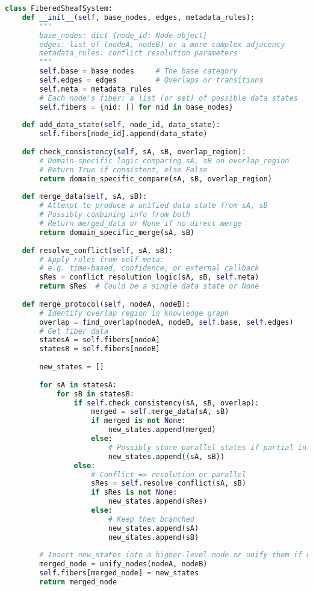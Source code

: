 \documentclass{article}
\begin{document}
\begin{lstlisting}[language=Python, caption=Fibered-Sheaf Merge Protocol in Pythonic Pseudocode, label=lst:python_impl]
class FiberedSheafSystem:
    def __init__(self, base_nodes, edges, metadata_rules):
        """
        base_nodes: dict {node_id: Node object}
        edges: list of (nodeA, nodeB) or a more complex adjacency
        metadata_rules: conflict resolution parameters
        """
        self.base = base_nodes     # The base category
        self.edges = edges         # Overlaps or transitions
        self.meta = metadata_rules
        # Each node's fiber: a list (or set) of possible data states
        self.fibers = {nid: [] for nid in base_nodes}
    
    def add_data_state(self, node_id, data_state):
        self.fibers[node_id].append(data_state)
    
    def check_consistency(self, sA, sB, overlap_region):
        # Domain-specific logic comparing sA, sB on overlap_region
        # Return True if consistent, else False
        return domain_specific_compare(sA, sB, overlap_region)
    
    def merge_data(self, sA, sB):
        # Attempt to produce a unified data state from sA, sB
        # Possibly combining info from both
        # Return merged_data or None if no direct merge
        return domain_specific_merge(sA, sB)
    
    def resolve_conflict(self, sA, sB):
        # Apply rules from self.meta:
        # e.g. time-based, confidence, or external callback
        sRes = conflict_resolution_logic(sA, sB, self.meta)
        return sRes  # Could be a single data state or None
    
    def merge_protocol(self, nodeA, nodeB):
        # Identify overlap region in knowledge graph
        overlap = find_overlap(nodeA, nodeB, self.base, self.edges)
        # Get fiber data
        statesA = self.fibers[nodeA]
        statesB = self.fibers[nodeB]
        
        new_states = []
        
        for sA in statesA:
            for sB in statesB:
                if self.check_consistency(sA, sB, overlap):
                    merged = self.merge_data(sA, sB)
                    if merged is not None:
                        new_states.append(merged)
                    else:
                        # Possibly store parallel states if partial info
                        new_states.append((sA, sB))  
                else:
                    # Conflict => resolution or parallel
                    sRes = self.resolve_conflict(sA, sB)
                    if sRes is not None:
                        new_states.append(sRes)
                    else:
                        # Keep them branched
                        new_states.append(sA)
                        new_states.append(sB)
        
        # Insert new_states into a higher-level node or unify them if needed
        merged_node = unify_nodes(nodeA, nodeB)
        self.fibers[merged_node] = new_states
        return merged_node
\end{lstlisting}
\end{document}
